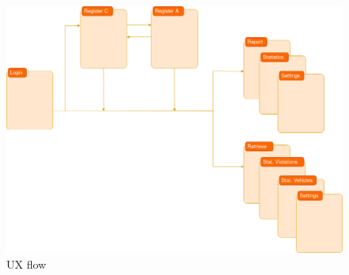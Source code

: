 \documentclass{article}
\begin{document}
\begin{figure}[H]
    \centering
    \includegraphics[scale=0.3]{img/UX_flow.png}
    \caption{UX flow}
\end{figure}
\end{document}

